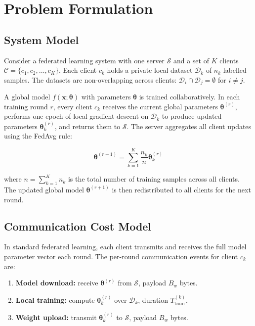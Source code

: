 \documentclass[12pt,a4paper]{report}
\begin{document}
\chapter{Problem Formulation}
\label{ch:problem}

\section{System Model}

Consider a federated learning system with one server $\mathcal{S}$ and a set of
$K$ clients $\mathcal{C} = \{c_1, c_2, \ldots, c_K\}$. Each client $c_k$ holds
a private local dataset $\mathcal{D}_k$ of $n_k$ labelled samples. The datasets
are non-overlapping across clients: $\mathcal{D}_i \cap \mathcal{D}_j = \emptyset$
for $i \neq j$.

A global model $f(\mathbf{x}; \boldsymbol{\theta})$ with parameters
$\boldsymbol{\theta}$ is trained collaboratively. In each training round $r$, every
client $c_k$ receives the current global parameters $\boldsymbol{\theta}^{(r)}$,
performs one epoch of local gradient descent on $\mathcal{D}_k$ to produce updated
parameters $\boldsymbol{\theta}_k^{(r)}$, and returns them to $\mathcal{S}$.
The server aggregates all client updates using the FedAvg rule:

\begin{equation}
  \boldsymbol{\theta}^{(r+1)} = \sum_{k=1}^{K} \frac{n_k}{n}
  \boldsymbol{\theta}_k^{(r)}
  \label{eq:fedavg}
\end{equation}

where $n = \sum_{k=1}^{K} n_k$ is the total number of training samples across
all clients. The updated global model $\boldsymbol{\theta}^{(r+1)}$ is then
redistributed to all clients for the next round.

\section{Communication Cost Model}

In standard federated learning, each client transmits and receives the full model
parameter vector each round. The per-round communication events for client $c_k$ are:

\begin{enumerate}
  \item \textbf{Model download:} receive $\boldsymbol{\theta}^{(r)}$ from
        $\mathcal{S}$, payload $B_w$ bytes.
  \item \textbf{Local training:} compute $\boldsymbol{\theta}_k^{(r)}$ over
        $\mathcal{D}_k$, duration $T_{\mathrm{train}}^{(k)}$.
  \item \textbf{Weight upload:} transmit $\boldsymbol{\theta}_k^{(r)}$ to
        $\mathcal{S}$, payload $B_w$ bytes.
\end{enumerate}
\end{document}
